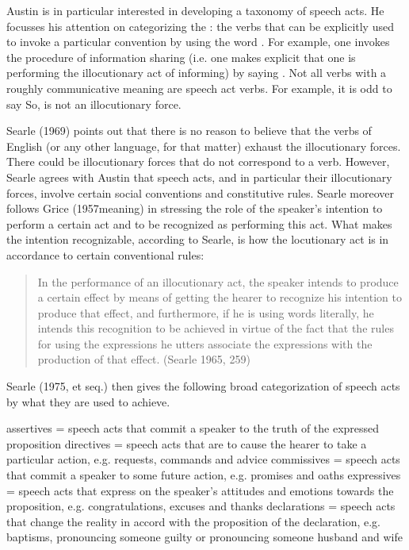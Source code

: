 Austin is in particular interested in developing a taxonomy of speech acts. He focusses his attention on categorizing the : the verbs that can be explicitly used to invoke a particular convention by using the word . For example, one invokes the procedure of information sharing (i.e. one makes explicit that one is performing the illocutionary act of informing) by saying . Not all verbs with a roughly communicative meaning are speech act verbs. For example, it is odd to say  So,  is not an illocutionary force.

Searle (1969) points out that there is no reason to believe that the verbs of English (or any other language, for that matter) exhaust the illocutionary forces. There could be illocutionary forces that do not correspond to a verb. However, Searle agrees with Austin that speech acts, and in particular their illocutionary forces, involve certain social conventions and constitutive rules. Searle moreover follows Grice (1957meaning) in stressing the role of the speaker’s intention to perform a certain act and to be recognized as performing this act. What makes the intention recognizable, according to Searle, is how the locutionary act is in accordance to certain conventional rules:

\begin{quote}
    

In the performance of an illocutionary act, the speaker intends to produce a certain effect by means of getting the hearer to recognize his intention to produce that effect, and furthermore, if he is using words literally, he intends this recognition to be achieved in virtue of the fact that the rules for using the expressions he utters associate the expressions with the production of that effect. \hfill (Searle 1965, 259)
\end{quote}

Searle (1975, et seq.) then gives the following broad categorization of speech acts by what they are used to achieve.

\bxl
assertives = speech acts that commit a speaker to the truth of the expressed proposition
\ex directives = speech acts that are to cause the hearer to take a particular action, e.g. requests, commands and advice
\ex commissives = speech acts that commit a speaker to some future action, e.g. promises and oaths
\ex expressives = speech acts that express on the speaker's attitudes and emotions towards the proposition, e.g. congratulations, excuses and thanks
\ex declarations = speech acts that change the reality in accord with the proposition of the declaration, e.g. baptisms, pronouncing someone guilty or pronouncing someone husband and wife
\exl
\eex

